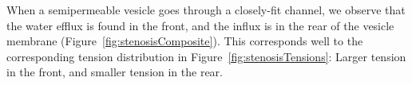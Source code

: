 \documentclass[prb,preprint,showpacs,preprintnumbers,amsmath,amssymb,longbibliography]{revtex4-1}
\begin{document}
When a semipermeable vesicle goes through a closely-fit channel, we observe that the water efflux is found in the front, and the influx is in the rear of the vesicle membrane (Figure~\ref{fig:stenosisComposite}). This corresponds well to the corresponding tension distribution in Figure~\ref{fig:stenosisTensions}: Larger tension in the front, and smaller tension in the rear.

\end{document}

